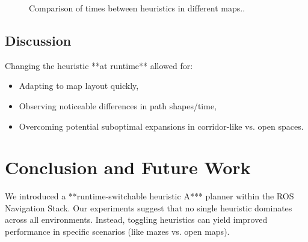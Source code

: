 \documentclass[letterpaper, 10 pt, conference]{ieeeconf}
\begin{document}
\begin{figure}[H] %
    \centering
    \caption{Comparison of times between heuristics in different maps..}
    \label{fig:heuristic_comparison}
\end{figure}

\subsection{Discussion}
Changing the heuristic **at runtime** allowed for:
\begin{itemize}
    \item Adapting to map layout quickly,
    \item Observing noticeable differences in path shapes/time,
    \item Overcoming potential suboptimal expansions in corridor-like vs. open spaces.
\end{itemize}


\section{Conclusion and Future Work}\label{sec:conclusion}
We introduced a **runtime-switchable heuristic A*** planner within the ROS Navigation 
Stack. Our experiments suggest that no single heuristic dominates across all 
environments. Instead, toggling heuristics can yield improved performance in 
specific scenarios (like mazes vs. open maps).
\end{document}
